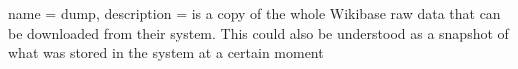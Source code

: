 {
    name = dump,
    description = { is a copy of the whole Wikibase raw data that can be downloaded from their system. This could also be understood as a snapshot of what was stored in the system at a certain moment}
}